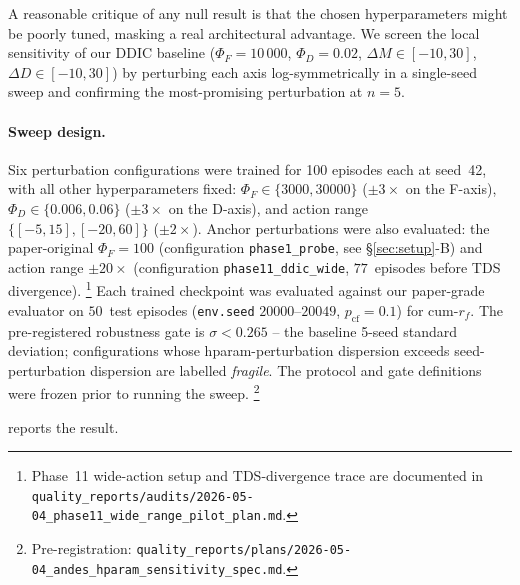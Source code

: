 \documentclass[journal,onecolumn,11pt]{IEEEtran}
\begin{document}
A reasonable critique of any null result is that the chosen
hyperparameters might be poorly tuned, masking a real architectural
advantage. We screen the local sensitivity of our DDIC baseline
($\Phi_F = 10\,000$, $\Phi_D = 0.02$, $\Delta M \in [-10, 30]$,
$\Delta D \in [-10, 30]$) by perturbing each axis log-symmetrically
in a single-seed sweep and confirming the most-promising perturbation
at $n = 5$.

\paragraph{Sweep design.} Six perturbation configurations were
trained for 100 episodes each at seed~42, with all other
hyperparameters fixed: $\Phi_F \in \{3000, 30000\}$ ($\pm 3\times$
on the F-axis), $\Phi_D \in \{0.006, 0.06\}$ ($\pm 3\times$ on the
D-axis), and action range $\{[-5, 15], [-20, 60]\}$ ($\pm 2\times$).
Anchor perturbations were also evaluated: the paper-original
$\Phi_F = 100$ (configuration \texttt{phase1\_probe}, see
\S\ref{sec:setup}-B) and action range $\pm 20\times$ (configuration
\texttt{phase11\_ddic\_wide}, $77$~episodes before TDS divergence).%
\footnote{Phase~11 wide-action setup and TDS-divergence trace are
documented in
\texttt{quality\_reports/audits/2026-05-04\_phase11\_wide\_range\_pilot\_plan.md}.}
Each trained checkpoint was evaluated against our paper-grade
evaluator on $50$~test episodes (\texttt{env.seed} $20000\text{--}20049$,
$p_{\text{cf}} = 0.1$) for cum-$r_f$. The pre-registered robustness
gate is $\sigma < 0.265$ -- the baseline 5-seed standard deviation;
configurations whose hparam-perturbation dispersion exceeds
seed-perturbation dispersion are labelled \emph{fragile}. The protocol
and gate definitions were frozen prior to running the sweep.%
\footnote{Pre-registration:
\texttt{quality\_reports/plans/2026-05-04\_andes\_hparam\_sensitivity\_spec.md}.}

 reports the result.
\end{document}
